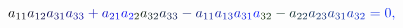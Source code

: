 \documentclass[12pt]{article}
\begin{document}
\begin{displaymath}
{a} _ { \mathcolor[RGB]{15,15,15}{1} \mathcolor[RGB]{15,15,30}{1} } \mathcolor[RGB]{15,15,45}{a} _ { \mathcolor[RGB]{15,15,60}{1} \mathcolor[RGB]{15,15,75}{2} } \mathcolor[RGB]{15,15,90}{a} _ { \mathcolor[RGB]{15,15,105}{3} \mathcolor[RGB]{15,15,120}{1} } \mathcolor[RGB]{15,15,135}{a} _ { \mathcolor[RGB]{15,15,150}{3} \mathcolor[RGB]{15,15,165}{3} } \mathcolor[RGB]{15,15,180}{+} \mathcolor[RGB]{15,15,195}{a} _ { \mathcolor[RGB]{15,15,210}{2} \mathcolor[RGB]{15,15,225}{1} } \mathcolor[RGB]{15,15,240}{a} _ { \mathcolor[RGB]{15,15,255}{2} \mathcolor[RGB]{15,30,0}{2} } \mathcolor[RGB]{15,30,15}{a} _ { \mathcolor[RGB]{15,30,30}{3} \mathcolor[RGB]{15,30,45}{2} } \mathcolor[RGB]{15,30,60}{a} _ { \mathcolor[RGB]{15,30,75}{3} \mathcolor[RGB]{15,30,90}{3} } \mathcolor[RGB]{15,30,105}{-} \mathcolor[RGB]{15,30,120}{a} _ { \mathcolor[RGB]{15,30,135}{1} \mathcolor[RGB]{15,30,150}{1} } \mathcolor[RGB]{15,30,165}{a} _ { \mathcolor[RGB]{15,30,180}{1} \mathcolor[RGB]{15,30,195}{3} } \mathcolor[RGB]{15,30,210}{a} _ { \mathcolor[RGB]{15,30,225}{3} \mathcolor[RGB]{15,30,240}{1} } \mathcolor[RGB]{15,30,255}{a} _ { \mathcolor[RGB]{15,45,0}{3} \mathcolor[RGB]{15,45,15}{2} } \mathcolor[RGB]{15,45,30}{-} \mathcolor[RGB]{15,45,45}{a} _ { \mathcolor[RGB]{15,45,60}{2} \mathcolor[RGB]{15,45,75}{2} } \mathcolor[RGB]{15,45,90}{a} _ { \mathcolor[RGB]{15,45,105}{2} \mathcolor[RGB]{15,45,120}{3} } \mathcolor[RGB]{15,45,135}{a} _ { \mathcolor[RGB]{15,45,150}{3} \mathcolor[RGB]{15,45,165}{1} } \mathcolor[RGB]{15,45,180}{a} _ { \mathcolor[RGB]{15,45,195}{3} \mathcolor[RGB]{15,45,210}{2} } \mathcolor[RGB]{15,45,225}{=} \mathcolor[RGB]{15,45,240}{0} \mathcolor[RGB]{15,45,255}{,} \mathcolor[RGB]{15,60,0}{\,
}
\end{displaymath}
\end{document}
